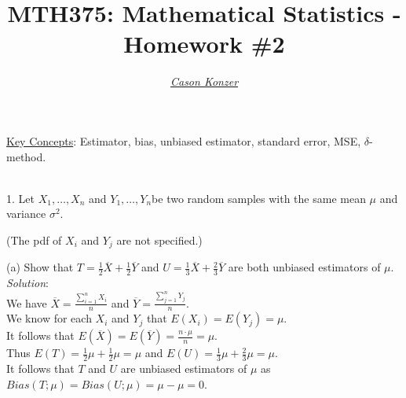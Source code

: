 \documentclass[12pt]{article}
\newcommand{\XB}{\color{black}}
\newcommand{\XBB}{\color{blue}}
\newcommand{\XV}{\color{violet}}
\begin{document}
\title{\textbf{MTH375}: Mathematical Statistics - Homework \#2}
\date{}
\author{\XV\textit{\large{\href{https://github.com/casonk}{Cason Konzer}}}\XB}

\maketitle
\hrulefill
\vfill
    \underline{Key Concepts}:  Estimator, bias, unbiased estimator, standard error, MSE, $\delta$-method.

\newpage
\newpage
\XBB\hrulefill\XB \\

1. Let $ X_{1}, \dots , X_{n} $ and $ Y_{1}, \dots , Y_{n} $be two random samples with the same mean $ \mu $ and variance $ \sigma^2 $.

(The pdf of $ X_{i} $ and $ Y_{j} $ are not specified.)

\XBB\hrulefill\XB
\vspace{5mm}

(a) Show that $ T = \frac{1}{2}\overline{X} + \frac{1}{2}\overline{Y} $ and $ U = \frac{1}{3}\overline{X} + \frac{2}{3}\overline{Y} $ are both unbiased estimators of $ \mu $.
\vspace{2.5mm} \\
\textit{Solution}:
\vspace{2.5mm} \\

\noindent
We have $ \displaystyle \overline{X} = \frac{\sum_{i=1}^{n} X_{i}}{n} $ and $ \displaystyle \overline{Y} = \frac{\sum_{j=1}^{n} Y_{j}}{n} $. \\

\noindent
We know for each $ X_{i} $ and $ Y_{j} $ that $ E(X_{i}) = E(Y_{j}) = \mu $. \\

\noindent
It follows that $ \displaystyle E(\overline{X}) = E(\overline{Y}) = \frac{n \cdot \mu}{n} = \mu $. \\

\noindent
Thus $ \displaystyle E(T) = \frac{1}{2}\mu + \frac{1}{2}\mu = \mu $ and $ \displaystyle  E(U) = \frac{1}{3}\mu + \frac{2}{3}\mu = \mu $. \\

\noindent
It follows that $ T $ and $ U $ are unbiased estimators of $ \mu $ as $ Bias(T;\mu) = Bias(U;\mu) = \mu - \mu = 0 $. \\
\end{document}
